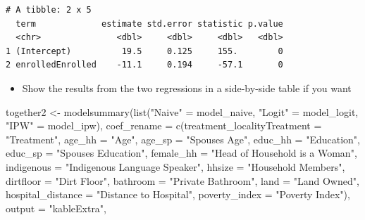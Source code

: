 \documentclass[
  letterpaper,
  DIV=11,
  numbers=noendperiod]{scrartcl}
\newenvironment{Shaded}{\begin{snugshade}}{\end{snugshade}}
\newcommand{\AttributeTok}[1]{\textcolor[rgb]{0.40,0.45,0.13}{#1}}
\newcommand{\FunctionTok}[1]{\textcolor[rgb]{0.28,0.35,0.67}{#1}}
\newcommand{\NormalTok}[1]{\textcolor[rgb]{0.00,0.23,0.31}{#1}}
\newcommand{\OtherTok}[1]{\textcolor[rgb]{0.00,0.23,0.31}{#1}}
\newcommand{\StringTok}[1]{\textcolor[rgb]{0.13,0.47,0.30}{#1}}
\providecommand{\tightlist}{%
  \setlength{\itemsep}{0pt}\setlength{\parskip}{0pt}}\usepackage{longtable,booktabs,array}
\begin{document}
\begin{verbatim}
# A tibble: 2 x 5
  term             estimate std.error statistic p.value
  <chr>               <dbl>     <dbl>     <dbl>   <dbl>
1 (Intercept)          19.5     0.125     155.        0
2 enrolledEnrolled    -11.1     0.194     -57.1       0
\end{verbatim}

\begin{itemize}
\tightlist
\item
  Show the results from the two regressions in a side-by-side table if
  you want
\end{itemize}

\begin{Shaded}
\begin{Highlighting}[numbers=left,,]
\NormalTok{together2 }\OtherTok{\textless{}{-}} \FunctionTok{modelsummary}\NormalTok{(}\FunctionTok{list}\NormalTok{(}\StringTok{"Naive"} \OtherTok{=}\NormalTok{ model\_naive,}
                               \StringTok{"Logit"} \OtherTok{=}\NormalTok{ model\_logit,}
                               \StringTok{"IPW"} \OtherTok{=}\NormalTok{ model\_ipw),}
             \AttributeTok{coef\_rename =} \FunctionTok{c}\NormalTok{(}\AttributeTok{treatment\_localityTreatment =} \StringTok{"Treatment"}\NormalTok{,}
                             \AttributeTok{age\_hh =} \StringTok{"Age"}\NormalTok{,}
                             \AttributeTok{age\_sp =} \StringTok{"Spouse\textquotesingle{}s Age"}\NormalTok{,}
                             \AttributeTok{educ\_hh =} \StringTok{"Education"}\NormalTok{,}
                             \AttributeTok{educ\_sp =} \StringTok{"Spouse\textquotesingle{}s Education"}\NormalTok{,}
                             \AttributeTok{female\_hh =} \StringTok{"Head of Household is a Woman"}\NormalTok{,}
                             \AttributeTok{indigenous =} \StringTok{"Indigenous Language Speaker"}\NormalTok{,}
                             \AttributeTok{hhsize =} \StringTok{"Household Members"}\NormalTok{,}
                             \AttributeTok{dirtfloor =} \StringTok{"Dirt Floor"}\NormalTok{,}
                             \AttributeTok{bathroom =} \StringTok{"Private Bathroom"}\NormalTok{,}
                             \AttributeTok{land =} \StringTok{"Land Owned"}\NormalTok{,}
                             \AttributeTok{hospital\_distance =} \StringTok{"Distance to Hospital"}\NormalTok{,}
                             \AttributeTok{poverty\_index =} \StringTok{"Poverty Index"}\NormalTok{),}
             \AttributeTok{output =} \StringTok{"kableExtra"}\NormalTok{,}

\end{Highlighting}
\end{Shaded}
\end{document}
